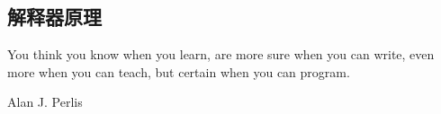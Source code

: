 \documentclass[preview,multi,crop=false,border=1in,class=memoir]{standalone}
\begin{document}
\begin{preview-page}
\chapter{解释器原理}
\epigraph{
You think you know when you learn, are more sure when you can write,
even more when you can teach, but certain when you can program.}{
Alan J. Perlis \cite{Perlis:1982:epigrams}}
\end{preview-page}




\begin{preview-page}
\MakeBib
\end{preview-page}
\end{document}

